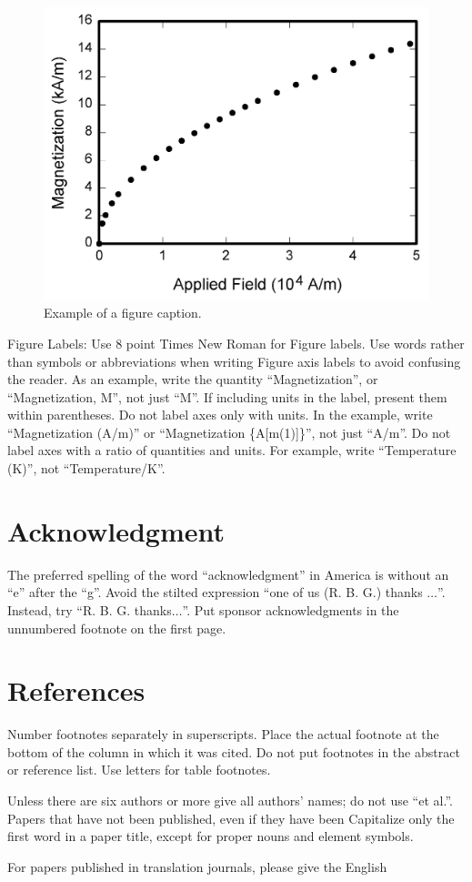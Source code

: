 \documentclass[conference]{IEEEtran}
\begin{document}
\begin{figure}[htbp]
\centerline{\includegraphics{fig1.png}}
\caption{Example of a figure caption.}
\label{fig}
\end{figure}

Figure Labels: Use 8 point Times New Roman for Figure labels. Use words 
rather than symbols or abbreviations when writing Figure axis labels to 
avoid confusing the reader. As an example, write the quantity 
``Magnetization'', or ``Magnetization, M'', not just ``M''. If including 
units in the label, present them within parentheses. Do not label axes only 
with units. In the example, write ``Magnetization (A/m)'' or ``Magnetization 
\{A[m(1)]\}'', not just ``A/m''. Do not label axes with a ratio of 
quantities and units. For example, write ``Temperature (K)'', not 
``Temperature/K''.

\section*{Acknowledgment}

The preferred spelling of the word ``acknowledgment'' in America is without 
an ``e'' after the ``g''. Avoid the stilted expression ``one of us (R. B. 
G.) thanks $\ldots$''. Instead, try ``R. B. G. thanks$\ldots$''. Put sponsor 
acknowledgments in the unnumbered footnote on the first page.

\section*{References}


Number footnotes separately in superscripts. Place the actual footnote at 
the bottom of the column in which it was cited. Do not put footnotes in the 
abstract or reference list. Use letters for table footnotes.

Unless there are six authors or more give all authors' names; do not use 
``et al.''. Papers that have not been published, even if they have been 
Capitalize only the first word in a paper title, except for proper nouns and 
element symbols.\cite{modeling-rl-games}

For papers published in translation journals, please give the English 

\vspace{12pt}


\end{document}
